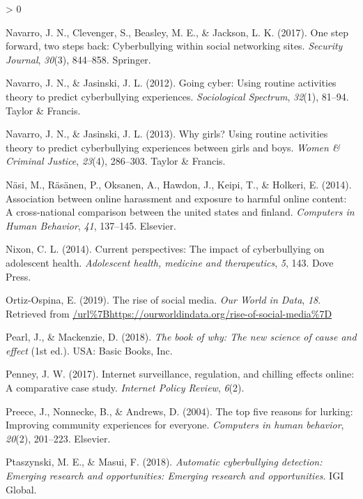 \documentclass[
  10pt,
  dvipsnames]{scrartcl}
\newlength{\cslhangindent}
\newenvironment{CSLReferences}[2] %
 {%
  \setlength{\parindent}{0pt}
  \ifodd #1 \everypar{\setlength{\hangindent}{\cslhangindent}}\ignorespaces\fi
  \ifnum #2 > 0
  \setlength{\parskip}{#2\baselineskip}
  \fi
 }%
 {}
\begin{document}
\begin{CSLReferences}{1}{0}
\leavevmode\hypertarget{ref-navarro2017one}{}%
Navarro, J. N., Clevenger, S., Beasley, M. E., \& Jackson, L. K. (2017).
One step forward, two steps back: Cyberbullying within social networking
sites. \emph{Security Journal}, \emph{30}(3), 844--858. Springer.

\leavevmode\hypertarget{ref-navarro2012going}{}%
Navarro, J. N., \& Jasinski, J. L. (2012). Going cyber: Using routine
activities theory to predict cyberbullying experiences.
\emph{Sociological Spectrum}, \emph{32}(1), 81--94. Taylor \& Francis.

\leavevmode\hypertarget{ref-navarro2013girls}{}%
Navarro, J. N., \& Jasinski, J. L. (2013). Why girls? Using routine
activities theory to predict cyberbullying experiences between girls and
boys. \emph{Women \& Criminal Justice}, \emph{23}(4), 286--303. Taylor
\& Francis.

\leavevmode\hypertarget{ref-nasi2014association}{}%
Näsi, M., Räsänen, P., Oksanen, A., Hawdon, J., Keipi, T., \& Holkeri,
E. (2014). Association between online harassment and exposure to harmful
online content: A cross-national comparison between the united states
and finland. \emph{Computers in Human Behavior}, \emph{41}, 137--145.
Elsevier.

\leavevmode\hypertarget{ref-nixon2014current}{}%
Nixon, C. L. (2014). Current perspectives: The impact of cyberbullying
on adolescent health. \emph{Adolescent health, medicine and
therapeutics}, \emph{5}, 143. Dove Press.

\leavevmode\hypertarget{ref-ortiz2019rise}{}%
Ortiz-Ospina, E. (2019). The rise of social media. \emph{Our World in
Data}, \emph{18}. Retrieved from
\url{/url\%7Bhttps://ourworldindata.org/rise-of-social-media\%7D}

\leavevmode\hypertarget{ref-pearl2018why}{}%
Pearl, J., \& Mackenzie, D. (2018). \emph{The book of why: The new
science of cause and effect} (1st ed.). USA: Basic Books, Inc.

\leavevmode\hypertarget{ref-penney2017internet}{}%
Penney, J. W. (2017). Internet surveillance, regulation, and chilling
effects online: A comparative case study. \emph{Internet Policy Review},
\emph{6}(2).

\leavevmode\hypertarget{ref-preece2004top}{}%
Preece, J., Nonnecke, B., \& Andrews, D. (2004). The top five reasons
for lurking: Improving community experiences for everyone.
\emph{Computers in human behavior}, \emph{20}(2), 201--223. Elsevier.

\leavevmode\hypertarget{ref-ptaszynski2018automatic}{}%
Ptaszynski, M. E., \& Masui, F. (2018). \emph{Automatic cyberbullying
detection: Emerging research and opportunities: Emerging research and
opportunities}. IGI Global.


\end{CSLReferences}
\end{document}
